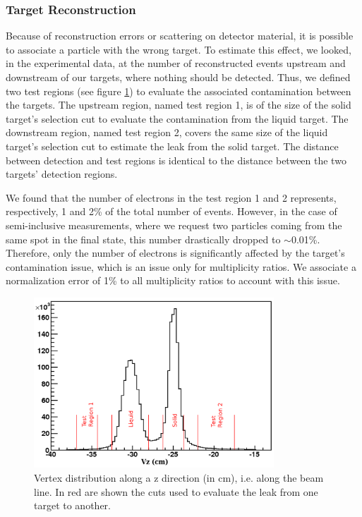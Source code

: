 \subsubsection{Target Reconstruction}

Because of reconstruction errors or scattering on detector material, it 
is possible to associate a particle with the wrong target. To estimate this 
effect, we looked, in the experimental data, at the number of reconstructed 
events upstream and downstream of our targets, where nothing should be 
detected. Thus, we defined two test regions (see figure \ref{fig:targetleak}) 
to evaluate the associated contamination between the targets. The upstream 
region, named test region 1, is of the size of the solid target's selection 
cut to evaluate the contamination from the liquid target. The downstream region, 
named test region 2, covers the same size of the liquid target's selection cut 
to estimate the leak from the solid target. The distance between detection and 
test regions is identical to the distance between the two targets' detection 
regions. 

We found that the number of electrons in the test region 1 and 2 represents, 
respectively, 1 and 2\% of the total number of events. However, in the case 
of semi-inclusive measurements, where we request two particles coming from the
same spot in the final state, this number drastically dropped to $\sim$0.01\%. 
Therefore, only the number of electrons is significantly affected by the 
target's contamination issue, which is an issue only for multiplicity ratios.
We associate a normalization error of 1\% to all multiplicity ratios to account
with this issue.

\begin{figure}[tbp]
\centering
\includegraphics[width=9cm] {chap5-fig/Vertex.png}
\caption {Vertex distribution along a z direction (in cm), i.e. along the 
beam line. In red are shown the cuts used to evaluate the leak from one target to 
another.}
\label{fig:targetleak}
\end{figure}

